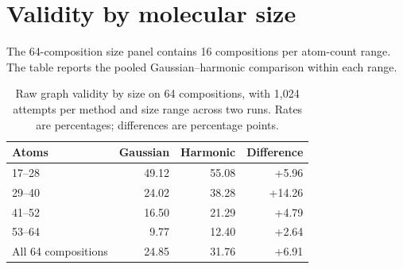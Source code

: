 \section{Validity by molecular size}\label{app:wide-size}
The 64-composition size panel contains 16 compositions per atom-count range. The table reports the pooled Gaussian--harmonic comparison within each range.

\begin{table}[t]
\centering
\caption{Raw graph validity by size on 64 compositions, with 1,024 attempts per method and size range across two runs. Rates are percentages; differences are percentage points.}
\begin{tabular}{lrrr}
\toprule
Atoms & Gaussian & Harmonic & Difference\\
\midrule
17--28 & 49.12 & 55.08 & +5.96\\
29--40 & 24.02 & 38.28 & +14.26\\
41--52 & 16.50 & 21.29 & +4.79\\
53--64 & 9.77 & 12.40 & +2.64\\
\midrule
All 64 compositions &24.85&31.76&+6.91\\
\bottomrule
\end{tabular}\label{tab:wide}
\end{table}
